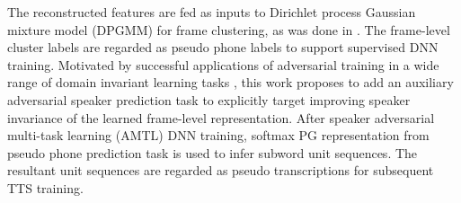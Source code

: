\documentclass[a4paper]{article}
\begin{document}
The  reconstructed features are fed as inputs to Dirichlet process Gaussian mixture model (DPGMM) \cite{chang2013parallel} for frame clustering, as was done in \cite{chen2015parallel}. 
The frame-level cluster labels are regarded as pseudo phone   labels to support supervised DNN training. Motivated by successful applications of adversarial training \cite{ganin2015unsupervised} in a wide range of   domain invariant learning tasks \cite{sun2017unsupvised,meng2018speaker,yi2019language,peng2019adversarial}, this work proposes to add an auxiliary adversarial speaker prediction task  to explicitly target improving  speaker invariance of the learned frame-level representation. 
After speaker adversarial multi-task learning (AMTL) DNN training, 
softmax PG representation from pseudo phone prediction task is used to infer subword unit sequences.
The resultant unit sequences are regarded as pseudo transcriptions for subsequent TTS training.
\end{document}

